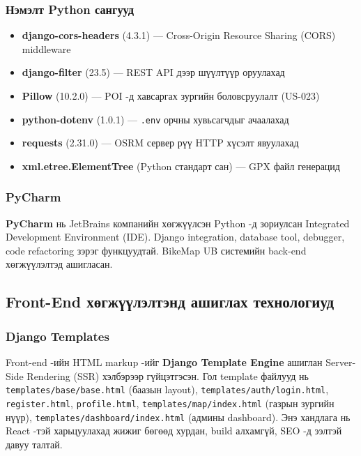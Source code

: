 \subsubsection{Нэмэлт Python сангууд}
\begin{itemize}
    \item \textbf{django-cors-headers} (4.3.1) — Cross-Origin Resource Sharing (CORS) middleware
    \item \textbf{django-filter} (23.5) — REST API дээр шүүлтүүр оруулахад
    \item \textbf{Pillow} (10.2.0) — POI -д хавсаргах зургийн боловсруулалт (US-023)
    \item \textbf{python-dotenv} (1.0.1) — \texttt{.env} орчны хувьсагчдыг ачаалахад
    \item \textbf{requests} (2.31.0) — OSRM сервер рүү HTTP хүсэлт явуулахад
    \item \textbf{xml.etree.ElementTree} (Python стандарт сан) — GPX файл генерацид
\end{itemize}

\subsubsection{PyCharm}
\textbf{PyCharm} нь JetBrains компанийн хөгжүүлсэн Python -д зориулсан Integrated Development Environment (IDE). Django integration, database tool, debugger, code refactoring зэрэг функцуудтай. BikeMap UB системийн back-end хөгжүүлэлтэд ашигласан.

\subsection{Front-End хөгжүүлэлтэнд ашиглах технологиуд}

\subsubsection{Django Templates}
Front-end -ийн HTML markup -ийг \textbf{Django Template Engine} ашиглан Server-Side Rendering (SSR) хэлбэрээр гүйцэтгэсэн. Гол template файлууд нь \texttt{templates/base/base.html} (баазын layout), \texttt{templates/auth/login.html}, \texttt{register.html}, \texttt{profile.html}, \texttt{templates/map/index.html} (газрын зургийн нүүр), \texttt{templates/dashboard/index.html} (админы dashboard). Энэ хандлага нь React -тэй харьцуулахад жижиг бөгөөд хурдан, build алхамгүй, SEO -д ээлтэй давуу талтай.

